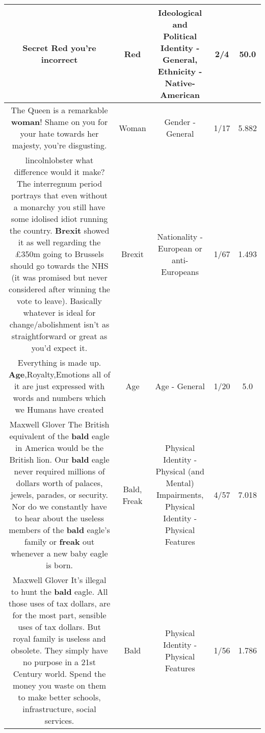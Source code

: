 \documentclass[11pt]{article}
\newlength\mylength
\begin{document}
\begin{center}
\begin{longtable}{|C{.65\mylength}|C{.30\mylength}|C{.12\mylength}|C{.12\mylength}|C{.12\mylength}|}
  \small Secret \textbf{R\textbf{ed}} you're incorrect\normalsize   & Red &  Ideological and Political Identity - General, Ethnicity - Native-American & 2/4 & 50.0 \\  \hline
  \small The Queen is a remarkable \textbf{woman}! Shame on you for your hate towards her majesty, you're disgusting.\normalsize   & Woman & Gender - General & 1/17 & 5.882 \\  \hline
  \small lincolnlobster what difference would it make? The interregnum period portrays that even without a monarchy you still have some idolised idiot running the country. \textbf{Brexit} showed it as well regarding the £350m going to Brussels should go towards the NHS (it was promised but never considered after winning the vote to leave). Basically whatever is ideal for change/abolishment isn't as straightforward or great as you'd expect it.\normalsize   & Brexit & Nationality - European or anti-Europeans & 1/67 & 1.493 \\  \hline
  \small Everything is made up. \textbf{Age},Royalty,Emotions all of it are just expressed with words and numbers which we Humans have created\normalsize   & Age & Age - General & 1/20 & 5.0 \\  \hline
  \small Maxwell Glover The British equivalent of the \textbf{bald} eagle in America would be the British lion.  Our \textbf{bald} eagle never required millions of dollars worth of palaces, jewels, parades, or security.  Nor do we constantly have to hear about the useless members of the \textbf{bald} eagle's family or \textbf{freak} out whenever a new baby eagle is born.\normalsize   & Bald, Freak & Physical Identity - Physical (and Mental) Impairments, Physical Identity - Physical Features & 4/57 & 7.018 \\  \hline
  \small Maxwell Glover It's illegal to hunt the \textbf{bald} eagle.  All those uses of tax dollars, are for the most part, sensible uses of tax dollars.  But royal family is useless and obsolete.  They simply have no purpose in a 21st Century world.  Spend the money you waste on them to make better schools, infrastructure, social services.\normalsize   & Bald & Physical Identity - Physical Features & 1/56 & 1.786 \\  \hline

\end{longtable}
\end{center}
\end{document}
